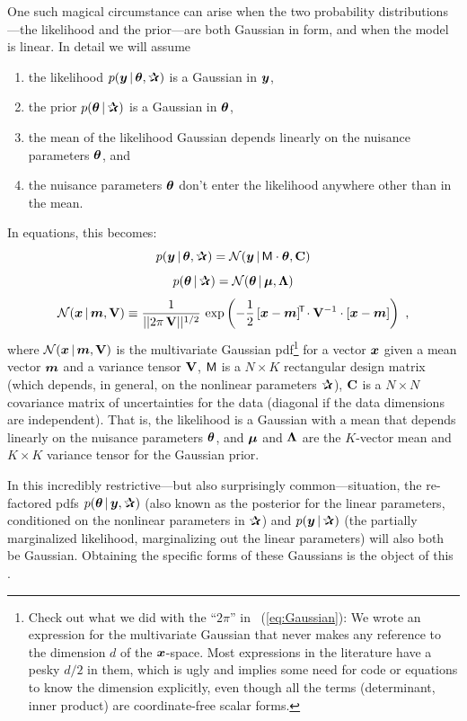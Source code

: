 One such magical circumstance can arise when the two probability
distributions---the likelihood and the prior---are both Gaussian in
form, and when the model is linear.
In detail we will assume
\begin{enumerate}
\item
the likelihood $p(\vy\given\vtheta,\bP)$ is a Gaussian in $\boldsymbol{y}$,
\item
the prior $p(\vtheta\given\bP)$ is a Gaussian in $\boldsymbol{\theta}$,
\item
the mean of the likelihood Gaussian depends linearly on the nuisance
parameters $\boldsymbol{\theta}$, and
\item
the nuisance parameters $\boldsymbol{\theta}$ don't enter the likelihood anywhere
other than in the mean.
\end{enumerate}
In equations, this becomes:
\begin{equation}
p(\vy\given\vtheta,\bP) = \normal(\vy\given\mM\cdot\vtheta,\tC)
\end{equation}
\begin{equation}
p(\vtheta\given\bP) = \normal(\vtheta\given\vmu,\tLambda)
\end{equation}
\begin{equation}\label{eq:Gaussian}
\mathcal{N}\!\,(\boldsymbol{x}\,|\,\boldsymbol{m},\mathbf{V}) \equiv \frac{1}{||2\pi\,\mathbf{V}||^{1/2}}\,\exp\left(-\frac{1}{2}\,[\boldsymbol{x}-\boldsymbol{m}]^{\!\mathsf{T}\!} \cdot \mathbf{V}^{-1} \cdot [\boldsymbol{x} - \boldsymbol{m}]\right)
~,
\end{equation}
where $\mathcal{N}\!\,(\boldsymbol{x}\,|\,\boldsymbol{m},\mathbf{V})$ is the multivariate Gaussian
pdf\footnote{Check out what we did with the ``$2\pi$'' in
  \equationname~(\ref{eq:Gaussian}): We wrote an expression for the
  multivariate Gaussian that never makes any reference to the
  dimension $d$ of the $\boldsymbol{x}$-space. Most expressions in the literature
  have a pesky $d/2$ in them, which is ugly and implies some need for
  code or equations to know the dimension explicitly, even though all
  the terms (determinant, inner product) are coordinate-free scalar
  forms.} for a vector $\boldsymbol{x}$
given a mean vector $\boldsymbol{m}$ and a variance tensor $\mathbf{V}$,
$\mathsf{M}$ is a $N\times K$ rectangular design matrix (which depends, in
general, on the nonlinear parameters $\bP$),
$\mathbf{C}$ is a $N\times N$ covariance matrix of uncertainties for the
data (diagonal if the data dimensions are independent).
That is, the likelihood is a Gaussian with a mean that depends
linearly on the nuisance parameters $\boldsymbol{\theta}$, and
$\boldsymbol{\mu}$ and $\mathbf{\Lambda}$ are the $K$-vector mean and $K\times K$ variance tensor
for the Gaussian prior.

In this incredibly restrictive---but also surprisingly
common---situation, the re-factored pdfs $p(\vtheta\given\vy,\bP)$
(also known as the posterior for the linear parameters, conditioned on
the nonlinear parameters in $\bP$) and $p(\vy\given\bP)$ (the
partially marginalized likelihood, marginalizing out the linear
parameters) will also both be Gaussian.
Obtaining the specific forms of these Gaussians is the object of this
\documentname.

